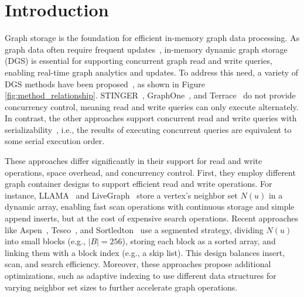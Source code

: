 \section{Introduction} \label{sec:introduction}

Graph storage is the foundation for efficient in-memory graph data processing. As graph data often require frequent updates~\cite{sahu2017ubiquity,sakr2021future}, in-memory dynamic graph storage (DGS) is essential for supporting concurrent graph read and write queries, enabling real-time graph analytics and updates. To address this need, a variety of DGS methods have been proposed~\cite{ediger2012stinger,dhulipala2019low,macko2015llama,kumar2020graphone,pandey2021terrace,de2021teseo,fuchs2022sortledton,zhu2019livegraph}, as shown in Figure \ref{fig:method_relationship}. STINGER~\cite{ediger2012stinger}, GraphOne~\cite{kumar2020graphone}, and Terrace~\cite{pandey2021terrace} do not provide concurrency control, meaning read and write queries can only execute alternately. In contrast, the other approaches support concurrent read and write queries with serializability~\cite{ramakrishnan2002database}, i.e., the results of executing concurrent queries are equivalent to some serial execution order. 

These approaches differ significantly in their support for read and write operations, space overhead, and concurrency control. First, they employ different graph container designs to support efficient read and write operations. For instance, LLAMA~\cite{macko2015llama} and LiveGraph~\cite{zhu2019livegraph} store a vertex's neighbor set $N(u)$ in a dynamic array, enabling fast scan operations with continuous storage and simple append inserts, but at the cost of expensive search operations. Recent approaches like Aspen~\cite{dhulipala2019low}, Teseo~\cite{de2021teseo}, and Sortledton~\cite{fuchs2022sortledton} use a segmented strategy, dividing $N(u)$ into small blocks (e.g., $|B| = 256$), storing each block as a sorted array, and linking them with a block index (e.g., a skip list). This design balances insert, scan, and search efficiency. Moreover, these approaches propose additional optimizations, such as adaptive indexing to use different data structures for varying neighbor set sizes to further accelerate graph operations.

